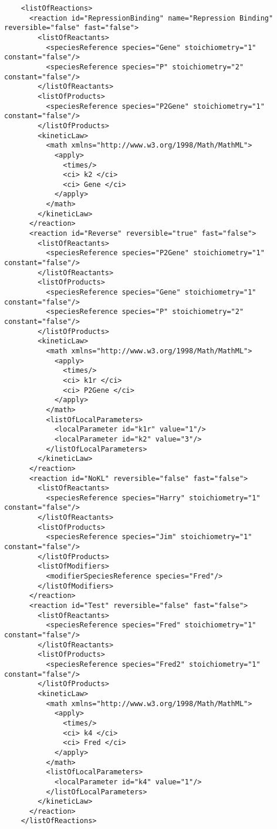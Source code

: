 \documentclass[11pt,a4paper]{article}
\begin{document}
{\scriptsize
\begin{verbatim}
    <listOfReactions>
      <reaction id="RepressionBinding" name="Repression Binding" reversible="false" fast="false">
        <listOfReactants>
          <speciesReference species="Gene" stoichiometry="1" constant="false"/>
          <speciesReference species="P" stoichiometry="2" constant="false"/>
        </listOfReactants>
        <listOfProducts>
          <speciesReference species="P2Gene" stoichiometry="1" constant="false"/>
        </listOfProducts>
        <kineticLaw>
          <math xmlns="http://www.w3.org/1998/Math/MathML">
            <apply>
              <times/>
              <ci> k2 </ci>
              <ci> Gene </ci>
            </apply>
          </math>
        </kineticLaw>
      </reaction>
      <reaction id="Reverse" reversible="true" fast="false">
        <listOfReactants>
          <speciesReference species="P2Gene" stoichiometry="1" constant="false"/>
        </listOfReactants>
        <listOfProducts>
          <speciesReference species="Gene" stoichiometry="1" constant="false"/>
          <speciesReference species="P" stoichiometry="2" constant="false"/>
        </listOfProducts>
        <kineticLaw>
          <math xmlns="http://www.w3.org/1998/Math/MathML">
            <apply>
              <times/>
              <ci> k1r </ci>
              <ci> P2Gene </ci>
            </apply>
          </math>
          <listOfLocalParameters>
            <localParameter id="k1r" value="1"/>
            <localParameter id="k2" value="3"/>
          </listOfLocalParameters>
        </kineticLaw>
      </reaction>
      <reaction id="NoKL" reversible="false" fast="false">
        <listOfReactants>
          <speciesReference species="Harry" stoichiometry="1" constant="false"/>
        </listOfReactants>
        <listOfProducts>
          <speciesReference species="Jim" stoichiometry="1" constant="false"/>
        </listOfProducts>
        <listOfModifiers>
          <modifierSpeciesReference species="Fred"/>
        </listOfModifiers>
      </reaction>
      <reaction id="Test" reversible="false" fast="false">
        <listOfReactants>
          <speciesReference species="Fred" stoichiometry="1" constant="false"/>
        </listOfReactants>
        <listOfProducts>
          <speciesReference species="Fred2" stoichiometry="1" constant="false"/>
        </listOfProducts>
        <kineticLaw>
          <math xmlns="http://www.w3.org/1998/Math/MathML">
            <apply>
              <times/>
              <ci> k4 </ci>
              <ci> Fred </ci>
            </apply>
          </math>
          <listOfLocalParameters>
            <localParameter id="k4" value="1"/>
          </listOfLocalParameters>
        </kineticLaw>
      </reaction>
    </listOfReactions>
\end{verbatim}}
\end{document}
